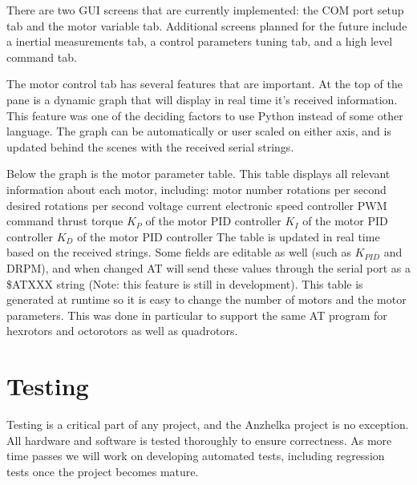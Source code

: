 \documentclass{article}
\numberwithin{equation}{section} %
\begin{document}
There are two GUI screens that are currently implemented: the COM port setup tab and the motor variable tab. Additional screens planned for the future include a inertial measurements tab, a control parameters tuning tab, and a high level command tab.

The motor control tab has several features that are important. At the top of the pane is a dynamic graph that will display in real time it's received information. This feature was one of the deciding factors to use Python instead of some other language. The graph can be automatically or user scaled on either axis, and is updated behind the scenes with the received serial strings.

Below the graph is the motor parameter table. This table displays all relevant information about each motor, including: 
motor number
rotations per second
desired rotations per second
voltage
current
electronic speed controller PWM command
thrust
torque
$K_P$ of the motor PID controller
$K_I$ of the motor PID controller
$K_D$ of the motor PID controller
The table is updated in real time based on the received strings. Some fields are editable as well (such as $K_{PID}$ and DRPM), and when changed AT will send these values through the serial port as a \$ATXXX string (Note: this feature is still in development). This table is generated at runtime so it is easy to change the number of motors and the motor parameters. This was done in particular to support the same AT program for hexrotors and octorotors as well as quadrotors.




\section{Testing}
Testing is a critical part of any project, and the Anzhelka project is no exception. All hardware and software is tested thoroughly to ensure correctness. As more time passes we will work on developing automated tests, including regression tests once the project becomes mature.

\end{document}
